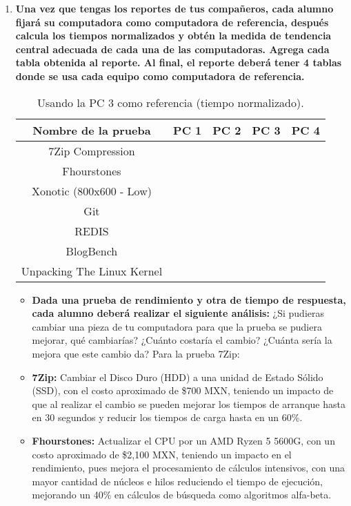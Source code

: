 \documentclass[12pt]{article}
\newcommand{\pl}[1]{\item \textbf{ #1 }}
\begin{document}
\begin{enumerate}[label=(\arabic{section}.\arabic{subsection}.\arabic{enumi})]
    \pl{Una vez que tengas los reportes de tus compañeros, cada alumno fijará su computadora como computadora de referencia, después calcula los tiempos normalizados y obtén la medida de tendencia central adecuada de cada una de las computadoras. Agrega cada tabla obtenida al reporte. Al final, el reporte deberá tener 4 tablas donde se usa cada equipo como computadora de referencia.}

    \begin{table}[htb]
        \centering
        \begin{tabular}{|c|c|c|c|c|}
        \hline
        \textbf{Nombre de la prueba} & \textbf{PC 1} & \textbf{PC 2} & \textbf{PC 3} & \textbf{PC 4}\\
        \hline
        7Zip Compression & & & & \\
        \hline
        Fhourstones & & & & \\
        \hline
        Xonotic (800x600 - Low) & & & &  \\
        \hline
        Git & & & &  \\
        \hline
        REDIS & & & &  \\
        \hline
        BlogBench & & & &  \\
        \hline
        Unpacking The Linux Kernel & & & & \\
        \hline
        \end{tabular}
        \caption{Usando la PC 3 como referencia (tiempo normalizado).}
    \end{table}

    \begin{itemize}
    	\item \textbf{Dada una prueba de rendimiento y otra de tiempo de respuesta, cada alumno deberá realizar el siguiente análisis:} ¿Si pudieras cambiar una pieza de tu computadora para que la prueba se pudiera mejorar, qué cambiarías? ¿Cuánto costaría el cambio? ¿Cuánta sería la mejora que este cambio da? Para la prueba 7Zip:
    	
    	\item \textbf{7Zip:} Cambiar el Disco Duro (HDD) a una unidad de Estado Sólido (SSD), con el costo aproximado de \$700 MXN, teniendo un impacto de que al realizar el cambio se pueden mejorar los tiempos de arranque hasta en 30 segundos y reducir los tiempos de carga hasta en un 60\%.
    	
    	\item \textbf{Fhourstones:} Actualizar el CPU por un AMD Ryzen 5 5600G, con un costo aproximado de \$2,100 MXN, teniendo un impacto en el rendimiento, pues mejora el procesamiento de cálculos intensivos, con una mayor cantidad de núcleos e hilos reduciendo el tiempo de ejecución, mejorando un 40\% en cálculos de búsqueda como algoritmos alfa-beta.
    	

\end{itemize}
\end{enumerate}
\end{document}
